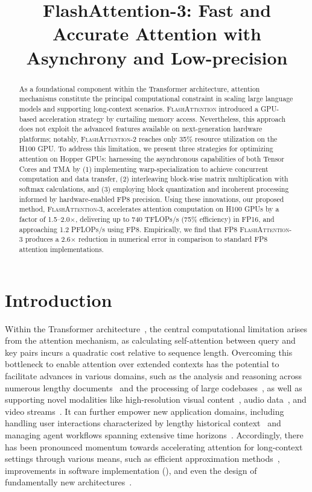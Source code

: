 \title{FlashAttention-3: Fast and Accurate Attention with Asynchrony and Low-precision}

\begin{abstract}
As a foundational component within the Transformer architecture, attention mechanisms constitute the principal computational constraint in scaling large language models and supporting long-context scenarios. \textsc{FlashAttention} introduced a GPU-based acceleration strategy by curtailing memory access. Nevertheless, this approach does not exploit the advanced features available on next-generation hardware platforms; notably, \textsc{FlashAttention-2} reaches only 35\% resource utilization on the H100 GPU. To address this limitation, we present three strategies for optimizing attention on Hopper GPUs: harnessing the asynchronous capabilities of both Tensor Cores and TMA by (1) implementing warp-specialization to achieve concurrent computation and data transfer, (2) interleaving block-wise matrix multiplication with softmax calculations, and (3) employing block quantization and incoherent processing informed by hardware-enabled FP8 precision. Using these innovations, our proposed method, \textsc{FlashAttention-3}, accelerates attention computation on H100 GPUs by a factor of 1.5–2.0$\times$, delivering up to 740 TFLOPs/s (75\% efficiency) in FP16, and approaching 1.2 PFLOPs/s using FP8. Empirically, we find that FP8 \textsc{FlashAttention-3} produces a 2.6$\times$ reduction in numerical error in comparison to standard FP8 attention implementations.
\end{abstract}

\section{Introduction}
\label{sec:intro}

Within the Transformer architecture~\citep{vaswani2017attention}, the central computational limitation arises from the attention mechanism, as calculating self-attention between query and key pairs incurs a quadratic cost relative to sequence length. Overcoming this bottleneck to enable attention over extended contexts has the potential to facilitate advances in various domains, such as the analysis and reasoning across numerous lengthy documents~\citep{guo2021longt5,shaham2022scrolls,peng2023yarn} and the processing of large codebases~\citep{roziere2023code, li2023starcoder}, as well as supporting novel modalities like high-resolution visual content~\citep{chen2022scaling}, audio data~\citep{gulati2020conformer}, and video streams~\citep{ho2022video}. It can further empower new application domains, including handling user interactions characterized by lengthy historical context~\citep{sun2019bert4rec} and managing agent workflows spanning extensive time horizons~\citep{yao2022react}. Accordingly, there has been pronounced momentum towards accelerating attention for long-context settings through various means, such as efficient approximation methods~\citep{katharopoulos2020transformers,choromanski2020rethinking, tay2020efficient}, improvements in software implementation (\citep{rabe2021self,dao2022flashattention,kwon2023efficient}), and even the design of fundamentally new architectures~\citep{peng2023rwkv,sun2023retentive,gu2023mamba}.


